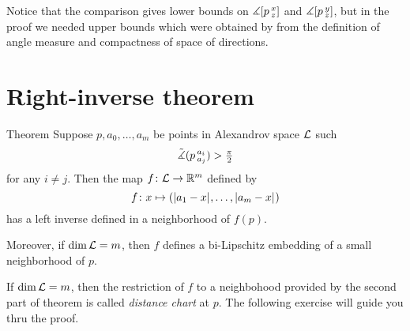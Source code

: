 Notice that the comparison gives lower bounds on $\measuredangle[p\,{}^{x}_{z}]$ and $\measuredangle[p\,{}^{y}_{z}]$, but in the proof we needed upper bounds which were obtained by from the definition of angle measure and compactness of space of directions.

\section{Right-inverse theorem}

\begin{thm}{Theorem}\label{thm:right-inverse}
Suppose $p,a_0,\dots,a_m$ be points in Alexandrov space $\mathcal{L}$ such
\[\tilde\measuredangle(p\,{}^{a_i}_{a_j})>\tfrac\pi2\]
for any $i\ne j$.
Then the map $f\colon\mathcal{L}\to\mathbb{R}^m$ defined by
\[f\:x\mapsto (\dist{a_1}{x}{},\dots,\dist{a_m}{x}{})\]
has a left inverse defined in a neighborhood of $f(p)$.

Moreover, if $\operatorname{\rm dim}\nolimits\mathcal{L}=m$, then $f$ defines a bi-Lipschitz embedding of a small neighborhood of $p$.
\end{thm}

If $\operatorname{\rm dim}\nolimits\mathcal{L}=m$, then the restriction of $f$ to a neighbohood provided by the second part of theorem is called \emph{distance chart} at $p$.
The following exercise will guide you thru the proof.

